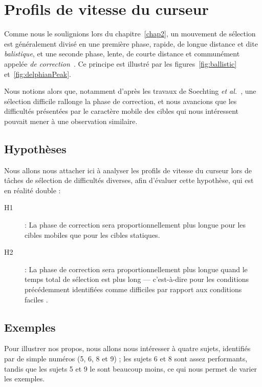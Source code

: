 \section{Profils de vitesse du curseur}
	Comme nous le soulignions lors du chapitre~\ref{chap2}, un mouvement de sélection est généralement divisé en une première phase, rapide, de longue distance et dite \emph{balistique}, et une seconde phase, lente, de courte distance et communément appelée \emph{de correction}~\cite{mackenzie1987three, crossman1983feedback}. Ce principe est illustré par les figures~\ref{fig:ballistic} et~\ref{fig:delphianPeak}.
	
	Nous notions alors que, notamment d'après les travaux de Soechting \emph{et al.}~\cite{soechting1984effect}, une sélection difficile rallonge la phase de correction, et nous avancions que les difficultés présentées par le caractère mobile des cibles qui nous intéressent pouvait mener à une observation similaire.
	
	\subsection{Hypothèses}
	Nous allons nous attacher ici à analyser les profils de vitesse du curseur lors de tâches de sélection de difficultés diverses, afin d'évaluer cette hypothèse, qui est en réalité double :
	
	\begin{description}
		\item[H1] : La phase de correction sera proportionnellement plus longue pour les cibles mobiles que pour les cibles statiques.
		\item[H2] : La phase de correction sera proportionnellement plus longue quand le temps total de sélection est plus long --- c'est-à-dire pour les conditions précédemment identifiées comme \og difficiles \fg{} par rapport aux conditions \og faciles \fg{}.
	\end{description}
	
	\subsection{Exemples}
	Pour illustrer nos propos, nous allons nous intéresser à quatre sujets, identifiés par de simple numéros (5, 6, 8 et 9) ; les sujets 6 et 8 sont assez performants, tandis que les sujets 5 et 9 le sont beaucoup moins, ce qui nous permet de varier les exemples.
	
